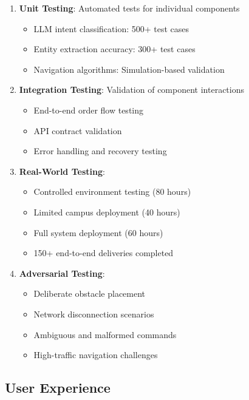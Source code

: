 \documentclass[12pt]{article}
\begin{document}
\begin{enumerate}
    \item \textbf{Unit Testing}: Automated tests for individual components
    \begin{itemize}
        \item LLM intent classification: 500+ test cases
        \item Entity extraction accuracy: 300+ test cases
        \item Navigation algorithms: Simulation-based validation
    \end{itemize}
    
    \item \textbf{Integration Testing}: Validation of component interactions
    \begin{itemize}
        \item End-to-end order flow testing
        \item API contract validation
        \item Error handling and recovery testing
    \end{itemize}
    
    \item \textbf{Real-World Testing}:
    \begin{itemize}
        \item Controlled environment testing (80 hours)
        \item Limited campus deployment (40 hours)
        \item Full system deployment (60 hours)
        \item 150+ end-to-end deliveries completed
    \end{itemize}
    
    \item \textbf{Adversarial Testing}:
    \begin{itemize}
        \item Deliberate obstacle placement
        \item Network disconnection scenarios
        \item Ambiguous and malformed commands
        \item High-traffic navigation challenges
    \end{itemize}
\end{enumerate}

\subsection{User Experience}
\end{document}
